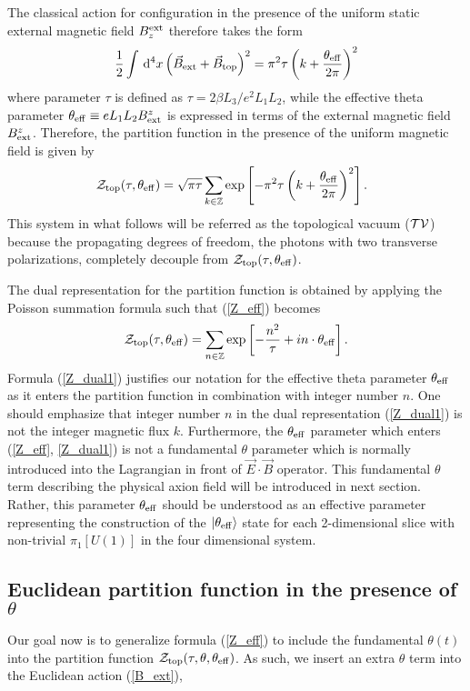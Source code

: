 \documentclass[ twocolumn,aps,prd,   
               preprintnumbers,numbers,sort&compress,nofootinbib,
                            showpacs,superscriptaddress,
               colorlinks,
               linkcolor=blue,   
               citecolor=blue]{revtex4-1}   \newcommand{\exclude}[1]{}
\newcommand{\be}{\begin{eqnarray}}
\newcommand{\ee}{\end{eqnarray}}
\def\dd{ \,\mathrm{d} }
\def\ra{\rangle}
\begin{document}
 

The classical action for configuration in the presence of the uniform static external magnetic field $B_{z}^{\rm ext}$ therefore takes the form 
\be
\label{B_ext}
\frac{1}{2}\int \dd^4 x  \left(\vec{B}_{\rm ext} + \vec{B}_{\rm top}\right)^2=  \pi^2\tau\left(k+\frac{\theta_{\rm eff}}{2\pi} \right)^2
\ee
where parameter $\tau$ is defined as  $\tau = 2\beta L_3/e^2L_1L_2$, while    the effective theta parameter $\theta_{\rm eff} \equiv e L_1L_2 B^z_{\rm ext}$ is expressed in terms of the external magnetic field $B^z_{\rm ext}$.
Therefore, the partition function in the presence of the uniform magnetic field  is given by  \cite{Cao:2013na,Zhitnitsky:2015fpa} 
\be 
\label{Z_eff}
  {\cal{Z}}_{\rm top}(\tau, \theta_{\rm eff})
 =\sqrt{\pi\tau} \sum_{k \in \mathbb{Z}} \exp\left[-\pi^2\tau \left(k+\frac{\theta_{\rm eff}}{2\pi}\right)^2\right].~~
\ee
This system in what follows will be referred as the topological vacuum ($\cal{TV}$) because the  propagating degrees of freedom, the photons with two transverse polarizations,   
completely decouple from  ${\cal{Z}}_{\rm top}(\tau, \theta_{\rm eff})$. 

 
  The dual representation for the partition function is obtained by applying the Poisson summation formula  such that (\ref{Z_eff}) becomes 
  \be 
\label{Z_dual1}
  {\cal{Z}}_{\rm top}(\tau, \theta_{\rm eff})
  = \sum_{n\in \mathbb{Z}} \exp\left[-\frac{n^2}{\tau}+in\cdot\theta_{\rm eff}\right]. 
  \ee
 Formula (\ref{Z_dual1})  justifies our notation for  the effective theta parameter $\theta_{\rm eff}$ as it enters the partition function in combination with integer number $n$. One should emphasize that integer  number $n$ in the dual representation (\ref{Z_dual1}) is not the integer magnetic flux $k$.    Furthermore,  the $\theta_{\rm eff}$ parameter which enters (\ref{Z_eff}, \ref{Z_dual1}) is not a fundamental $\theta$ parameter which is normally introduced into the Lagrangian  in front of  $\vec{E}\cdot\vec{B}$ operator. This fundamental $\theta$ term  describing the physical axion field will be 
 introduced in next section. Rather, this parameter  $\theta_{\rm eff}$ should be understood as an effective parameter representing the construction of the  $|\theta_{\rm eff}\ra$ state for each 2-dimensional slice with non-trivial $\pi_1[U(1)]$ in the four dimensional system.  
 

 \subsection{Euclidean partition function in the presence of $\theta$}\label{Z_theta}
 Our goal now is to generalize formula (\ref{Z_eff}) to include the fundamental $\theta (t)$ into the partition function ${\cal{Z}}_{\rm top}(\tau, \theta, \theta_{\rm eff})$. As such, we insert an extra $\theta$ term into  the Euclidean action (\ref{B_ext}),
\end{document}
